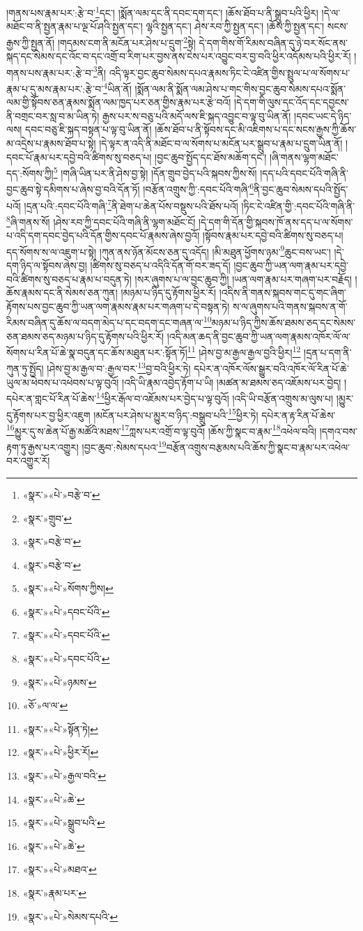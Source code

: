 །གནས་པས་རྣམ་པར་:རྩེ་བ་\footnote{«སྣར་»«པེ་»བརྩེ་བ་}དང་། །སྨོན་ལམ་དང་ནི་དབང་དག་དང་། །ཆོས་ཐོབ་པ་ནི་སྒྲུབ་པའི་ཕྱིར། །དེ་ལ་མཐོང་བ་ནི་སྤྱན་རྣམ་པ་ལྔ་པོ་ཤའི་སྤྱན་དང་། ལྷའི་སྤྱན་དང་། ཤེས་རབ་ཀྱི་སྤྱན་དང་། །ཆོས་ཀྱི་སྤྱན་དང་། སངས་རྒྱས་ཀྱི་སྤྱན་ནོ། །གདམས་ངག་ནི་མངོན་པར་ཤེས་པ་དྲུག་\footnote{«སྣར་»གྲུབ་}སྟེ། དེ་དག་གིས་གོ་རིམས་བཞིན་དུ་ཉེ་བར་སོང་ནས་སྐད་དང་སེམས་དང་འོང་བ་དང་འགྲོ་བ་རིག་པར་བྱས་ནས་ངེས་པར་འབྱུང་བར་བྱ་བའི་ཕྱིར་འདོམས་པའི་ཕྱིར་རོ། །
གནས་པས་རྣམ་པར་:རྩེ་བ་\footnote{«སྣར་»བརྩེ་བ་}ནི། འདི་ལྟར་བྱང་ཆུབ་སེམས་དཔའ་རྣམས་ཏིང་ངེ་འཛིན་གྱིས་སྤྲུལ་པ་ལ་སོགས་པ་རྣམ་པ་དུ་མས་རྣམ་པར་:རྩེ་བ་\footnote{«སྣར་»བརྩེ་བ་}ཡིན་ནོ། །སྨོན་ལམ་ནི་སྨོན་ལམ་ཤེས་པ་གང་གིས་བྱང་ཆུབ་སེམས་དཔའ་སྨོན་ལམ་གྱི་སྟོབས་ཅན་རྣམས་སྨོན་ལམ་ཁྱད་པར་ཅན་གྱིས་རྣམ་པར་རྩེ་བའོ། །དེ་དག་གི་ལུས་དང་འོད་དང་དབྱངས་ནི་བགྲང་བར་སླ་བ་མ་ཡིན་ཏེ། རྒྱས་པར་ས་བཅུ་པའི་མདོ་ལས་ཇི་སྐད་འབྱུང་བ་ལྟ་བུ་ཡིན་ནོ། །དབང་ཡང་དེ་ཉིད་ལས། དབང་བཅུ་ཇི་སྐད་བསྟན་པ་ལྟ་བུ་ཡིན་ནོ། །ཆོས་ཐོབ་པ་ནི་སྟོབས་དང་མི་འཇིགས་པ་དང་སངས་རྒྱས་ཀྱི་ཆོས་མ་འདྲེས་པ་རྣམས་ཐོབ་པ་སྟེ། །དེ་ལྟར་ན་འདི་ནི་མཐོང་བ་ལ་སོགས་པ་མངོན་པར་སྒྲུབ་པ་རྣམ་པ་དྲུག་ཡིན་ནོ། །དབང་པོ་རྣམ་པར་དབྱེ་བའི་ཚིགས་སུ་བཅད་པ། །བྱང་ཆུབ་སྤྱོད་དང་ཐོས་མཆོག་དང་། །ཞི་གནས་ལྷག་མཐོང་དད་:སོགས་ཀྱི།\footnote{«སྣར་»«པེ་»སོགས་ཀྱིས།} །གཞི་ཡིན་པར་ནི་ཤེས་བྱ་སྟེ། །དོན་གྲུབ་བྱེད་པའི་སྐབས་ཀྱིས་སོ། །དད་པའི་དབང་པོའི་གཞི་ནི་བྱང་ཆུབ་སྟེ་དམིགས་པ་ཞེས་བྱ་བའི་དོན་ཏོ། །བརྩོན་འགྲུས་ཀྱི་:དབང་པོའི་གཞི་\footnote{«སྣར་»«པེ་»དབང་པོའི་}ནི་བྱང་ཆུབ་སེམས་དཔའི་སྤྱོད་པའོ། །དྲན་པའི་:དབང་པོའི་གཞི་\footnote{«སྣར་»«པེ་»དབང་པོའི་}ནི་ཐེག་པ་ཆེན་པོས་བསྡུས་པའི་ཐོས་པའོ། །ཏིང་ངེ་འཛིན་གྱི་:དབང་པོའི་གཞི་ནི་\footnote{«སྣར་»«པེ་»དབང་པོའི་}ཞི་གནས་སོ། །ཤེས་རབ་ཀྱི་དབང་པོའི་གཞི་ནི་ལྷག་མཐོང་ངོ། །དེ་དག་གི་དོན་གྱི་སྐབས་ཁོ་ནས་དད་པ་ལ་སོགས་པ་འདི་དག་དབང་བྱེད་པའི་དོན་གྱིས་དབང་པོ་རྣམས་ཞེས་བྱའོ། །སྟོབས་རྣམ་པར་དབྱེ་བའི་ཚིགས་སུ་བཅད་པ། དད་སོགས་ས་ལ་འཇུག་པ་སྟེ། །ཀུན་ནས་ཉོན་མོངས་ཅན་དུ་འདོད། །མི་མཐུན་ཕྱོགས་ཉམ་\footnote{«སྣར་»«པེ་»ཉམས་}ཆུང་བས་ཡང་། །དེ་དག་ཉིད་ལ་སྟོབས་ཞེས་བྱ། །ཚིགས་སུ་བཅད་པ་འདིའི་དོན་གོ་བར་ཟད་དོ། །བྱང་ཆུབ་ཀྱི་ཡན་ལག་རྣམ་པར་དབྱེ་བའི་ཚིགས་སུ་བཅད་པ་རྣམ་པ་བདུན་ཏེ། །སར་ཞུགས་པ་ལ་བྱང་ཆུབ་ཀྱི། །ཡན་ལག་རྣམ་པར་གཞག་པར་བརྗོད། །ཆོས་རྣམས་དང་ནི་སེམས་ཅན་ཀུན། །མཉམ་པ་ཉིད་དུ་རྟོགས་ཕྱིར་རོ། །འདིས་ནི་གནས་སྐབས་གང་དུ་གང་ཞིག་རྟོགས་པས་བྱང་ཆུབ་ཀྱི་ཡན་ལག་རྣམས་རྣམ་པར་གཞག་པ་དེ་བསྟན་ཏེ། ས་ལ་ཞུགས་པའི་གནས་སྐབས་ན་གོ་རིམས་བཞིན་དུ་ཆོས་ལ་བདག་མེད་པ་དང་བདག་དང་གཞན་ལ་\footnote{«ཅོ་»ལ་ལ་}མཉམ་པ་ཉིད་ཀྱིས་ཆོས་ཐམས་ཅད་དང་སེམས་ཅན་ཐམས་ཅད་མཉམ་པ་ཉིད་དུ་རྟོགས་པའི་ཕྱིར་རོ། །འདི་མན་ཆད་ནི་བྱང་ཆུབ་ཀྱི་ཡན་ལག་རྣམས་འཁོར་ལོ་ལ་སོགས་པ་རིན་པོ་ཆེ་སྣ་བདུན་དང་ཆོས་མཐུན་པར་:སྟོན་ཏོ།\footnote{«སྣར་»«པེ་»སྟོན་ཏེ།} །ཤེས་བྱ་མ་རྒྱལ་རྒྱལ་བྱའི་ཕྱིར།\footnote{«སྣར་»«པེ་»ཕྱིར་རོ།} །དྲན་པ་དག་ནི་ཀུན་ཏུ་སྤྱོད། །ཤེས་བྱ་མ་རྒྱལ་བ་:རྒྱལ་བར་\footnote{«སྣར་»«པེ་»རྒྱལ་བའི་}བྱ་བའི་ཕྱིར་ཏེ། དཔེར་ན་འཁོར་ལོས་སྒྱུར་བའི་འཁོར་ལོ་རིན་པོ་ཆེ་ཡུལ་མ་ཕེབས་པ་འཕེབས་པ་ལྟ་བུའོ། །འདི་ཡི་རྣམ་འབྱེད་རྟོག་པ་ཡི། །མཚན་མ་ཐམས་ཅད་འཇོམས་པར་བྱེད། །དཔེར་ན་གླང་པོ་རིན་པོ་ཆེས་\footnote{«སྣར་»«པེ་»ཆེ་}ཕྱིར་རྒོལ་བ་འཇོམས་པར་བྱེད་པ་ལྟ་བུའོ། །འདི་ཡི་བརྩོན་འགྲུས་མ་ལུས་པ། །མྱུར་དུ་རྟོགས་པར་བྱ་ཕྱིར་འཇུག །མངོན་པར་ཤེས་པ་མྱུར་བ་ཉིད་:བསྒྲུབ་པའི་\footnote{«སྣར་»«པེ་»སྒྲུབ་པའི་}ཕྱིར་ཏེ། དཔེར་ན་རྟ་རིན་པོ་ཆེས་\footnote{«སྣར་»«པེ་»ཆེ་}མྱུར་དུ་ས་ཆེན་པོ་རྒྱ་མཚོའི་མཐས་\footnote{«སྣར་»«པེ་»མཐའ་}ཀླས་པར་འགྲོ་བ་ལྟ་བུའོ། །ཆོས་ཀྱི་སྣང་བ་རྣམ་\footnote{«སྣར་»རྣམ་པར་}འཕེལ་བའི། །དགའ་བས་རྟག་ཏུ་རྒྱས་པར་འགྱུར། །བྱང་ཆུབ་:སེམས་དཔའ་\footnote{«སྣར་»«པེ་»སེམས་དཔའི་}བརྩོན་འགྲུས་བརྩམས་པའི་ཆོས་ཀྱི་སྣང་བ་རྣམ་པར་འཕེལ་བར་འགྱུར་རོ། 